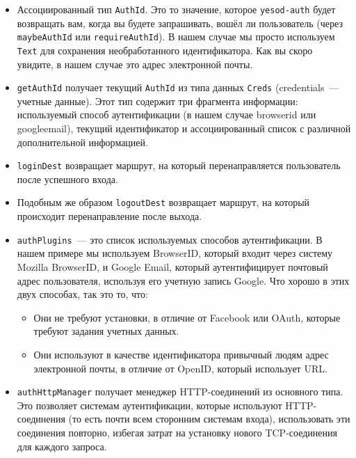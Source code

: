 \begin{itemize}
    \item Ассоциированный тип \lstinline'AuthId'. Это то значение, которое \lstinline'yesod-auth' будет возвращать вам, когда вы будете запрашивать, вошёл ли пользователь (через \lstinline'maybeAuthId' или \lstinline'requireAuthId'). В нашем случае мы просто используем \lstinline'Text' для сохранения необработанного идентификатора. Как вы скоро увидите, в нашем случае это адрес электронной почты. 

    \item \lstinline'getAuthId' получает текущий \lstinline'AuthId' из типа данных \lstinline'Creds' (credentials~--- учетные данные). Этот тип содержит три фрагмента информации: используемый способ аутентификации (в нашем случае browserid или googleemail), текущий идентификатор и ассоциированный список с различной дополнительной информацией.

    \item \lstinline'loginDest' возвращает маршрут, на который перенаправляется пользователь после успешного входа.

    \item Подобным же образом \lstinline'logoutDest' возвращает маршрут, на который происходит перенаправление после выхода. 

    \item \lstinline'authPlugins'~--- это список используемых способов аутентификации. В нашем примере мы используем BrowserID, который входит через систему Mozilla BrowserID, и Google Email, который аутентифицирует почтовый адрес пользователя, используя его учетную запись Google. Что хорошо в этих двух способах, так это то, что:
    
    \begin{itemize}
        \item Они не требуют установки, в отличие от Facebook или OAuth, которые требуют задания учетных данных.
        
        \item Они используют в качестве идентификатора привычный людям адрес электронной почты, в отличие от OpenID, который использует URL. 
    \end{itemize}
    
    \item \lstinline'authHttpManager' получает менеджер HTTP-соединений из основного типа. Это позволяет системам аутентификации, которые используют HTTP-соединения (то есть почти всем сторонним системам входа), использовать эти соединения повторно, избегая затрат на установку нового TCP-соединения для каждого запроса.
\end{itemize}


